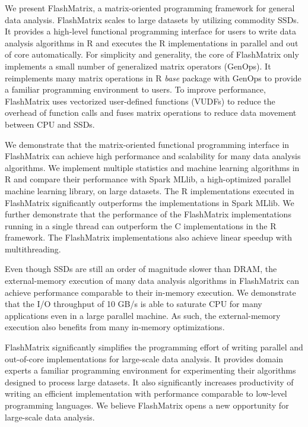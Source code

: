 We present FlashMatrix, a matrix-oriented programming framework for general
data analysis. FlashMatrix scales to large datasets by utilizing commodity SSDs.
It provides a high-level functional programming interface for users to write
data analysis algorithms in R and
executes the R implementations in parallel and out of core automatically.
For simplicity and generality, the core of FlashMatrix only implements
a small number of generalized matrix operators (GenOps). It reimplements
many matrix operations in R \textit{base} package with GenOps to provide
a familiar programming environment to users. To improve performance,
FlashMatrix uses vectorized user-defined functions (VUDFs) to reduce the
overhead of function calls and fuses matrix operations to reduce data movement
between CPU and SSDs.

We demonstrate that the matrix-oriented functional programming interface in
FlashMatrix can achieve high performance and scalability for many data analysis
algorithms. We implement multiple statistics and
machine learning algorithms in R and compare their performance with Spark
MLlib, a high-optimized parallel machine learning library, on large datasets.
The R implementations executed in FlashMatrix significantly outperforms
the implementations in Spark MLlib. We further demonstrate that the performance
of the FlashMatrix implementations running in a single thread can outperform
the C implementations in the R framework. The FlashMatrix implementations
also achieve linear speedup with multithreading.

Even though SSDs are still an order of magnitude slower than DRAM, the external-memory
execution of many data analysis algorithms in FlashMatrix can achieve performance
comparable to their in-memory execution. We demonstrate that the I/O throughput
of 10 GB/s is able to saturate CPU for many applications even in a large parallel
machine. As such, the external-memory execution also benefits from many in-memory
optimizations.

FlashMatrix significantly simplifies the programming effort of writing
parallel and out-of-core implementations for large-scale data analysis. It
provides domain experts a familiar programming environment for experimenting
their algorithms designed to process large datasets. It also significantly
increases productivity of writing an efficient implementation with performance
comparable to low-level programming languages. We believe FlashMatrix opens
a new opportunity for large-scale data analysis.
